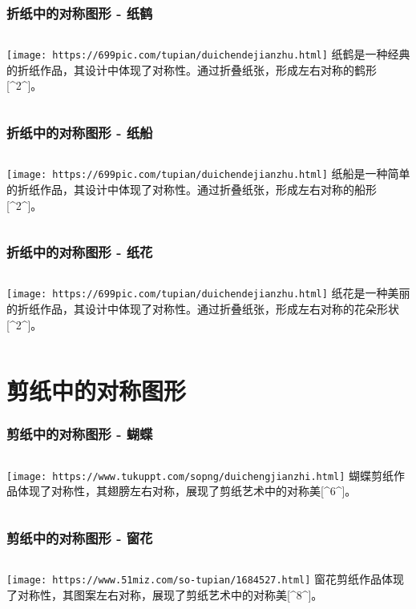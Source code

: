 \documentclass{ctexbeamer}
\begin{document}
\begin{frame}
\frametitle{折纸中的对称图形 - 纸鹤}
\begin{columns}
\texttt{[image: https://699pic.com/tupian/duichendejianzhu.html]}
纸鹤是一种经典的折纸作品，其设计中体现了对称性。通过折叠纸张，形成左右对称的鹤形[^2^]。
\end{columns}
\end{frame}

\begin{frame}
\frametitle{折纸中的对称图形 - 纸船}
\begin{columns}
\texttt{[image: https://699pic.com/tupian/duichendejianzhu.html]}
纸船是一种简单的折纸作品，其设计中体现了对称性。通过折叠纸张，形成左右对称的船形[^2^]。
\end{columns}
\end{frame}

\begin{frame}
\frametitle{折纸中的对称图形 - 纸花}
\begin{columns}
\texttt{[image: https://699pic.com/tupian/duichendejianzhu.html]}
纸花是一种美丽的折纸作品，其设计中体现了对称性。通过折叠纸张，形成左右对称的花朵形状[^2^]。
\end{columns}
\end{frame}

\section{剪纸中的对称图形}

\begin{frame}
\frametitle{剪纸中的对称图形 - 蝴蝶}
\begin{columns}
\texttt{[image: https://www.tukuppt.com/sopng/duichengjianzhi.html]}
蝴蝶剪纸作品体现了对称性，其翅膀左右对称，展现了剪纸艺术中的对称美[^6^]。
\end{columns}
\end{frame}

\begin{frame}
\frametitle{剪纸中的对称图形 - 窗花}
\begin{columns}
\texttt{[image: https://www.51miz.com/so-tupian/1684527.html]}
窗花剪纸作品体现了对称性，其图案左右对称，展现了剪纸艺术中的对称美[^8^]。
\end{columns}
\end{frame}
\end{document}
